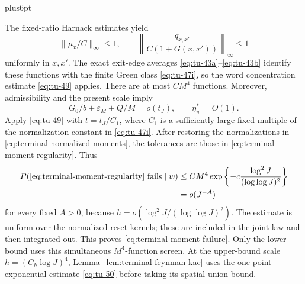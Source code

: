 \documentclass[12pt,reqno]{amsart}
\makeatletter
\theoremstyle{plain}
\theoremstyle{definition}
\theoremstyle{remark}
\renewenvironment{proof}[1][\proofname]{%
  \par
  \pushQED{\qed}%
  \normalfont
  \topsep6pt plus6pt\relax
  \trivlist
  \item[\hskip\labelsep\slshape #1\@addpunct{.}]%
  \ignorespaces
}{%
  \popQED
  \endtrivlist
  \@endpefalse
}
\DeclareRobustCommand{\qed}{%
  \leavevmode\unskip\penalty9999\hbox{}\nobreak
  \ifmmode
    \makebox[0pt][l]{\qquad\hbox{\qedsymbol}}%
  \else
    \qquad\hbox{\qedsymbol}%
  \fi
}
\renewcommand{\qedsymbol}{\rule[.47pt]{4pt}{6pt}}
\numberwithin{equation}{section}
\makeatother
\begin{document}
\begin{proof}
The fixed-ratio Harnack estimates yield
\begin{equation}
 \|\mu_x/C\|_\infty\le1,\qquad
 \left\|\frac{q_{x,x'}}{C(1+G(x,x'))}\right\|_\infty\le1
 \label{eq:terminal-normalized-moments}
\end{equation}
uniformly in $x,x'$.  The exact exit-edge averages \eqref{eq:tu-43a}--\eqref{eq:tu-43b}
identify these functions with the finite Green class \eqref{eq:tu-47i}, so the
word concentration estimate \eqref{eq:tu-49} applies.  There are at most $CM^4$
functions.  Moreover, admissibility and the present scale imply
\begin{equation}
 G_0/b+\varepsilon_M+Q/M=o(t_J),\qquad \eta_w^*=O(1).
 \label{eq:terminal-screen-errors}
\end{equation}
Apply \eqref{eq:tu-49} with $t=t_J/C_1$, where $C_1$ is a sufficiently large fixed
multiple of the normalization constant in \eqref{eq:tu-47i}.  After restoring
the normalizations in \eqref{eq:terminal-normalized-moments}, the
tolerances are those in \eqref{eq:terminal-moment-regularity}.  Thus
\begin{equation}
 \begin{split}
 P(\text{\eqref{eq:terminal-moment-regularity} fails}\mid w)
 &\le CM^4\exp\left\{-c\frac{\log^2J}{(\log\log J)^2}\right\}\\
 &=o(J^{-A})
 \end{split}
 \label{eq:terminal-screen-union-bound}
\end{equation}
for every fixed $A>0$, because
$h=o(\log^2J/(\log\log J)^2)$.  The estimate is uniform over the
normalized reset kernels; these are included in the joint law and
then integrated out.  This proves \eqref{eq:terminal-moment-failure}.
Only the lower bound uses this simultaneous $M^4$-function screen.
At the upper-bound scale $h=(C_h\log J)^4$, Lemma~\ref{lem:terminal-feynman-kac}
uses the one-point exponential estimate \eqref{eq:tu-50} before taking its
spatial union bound.


\end{proof}
\end{document}

